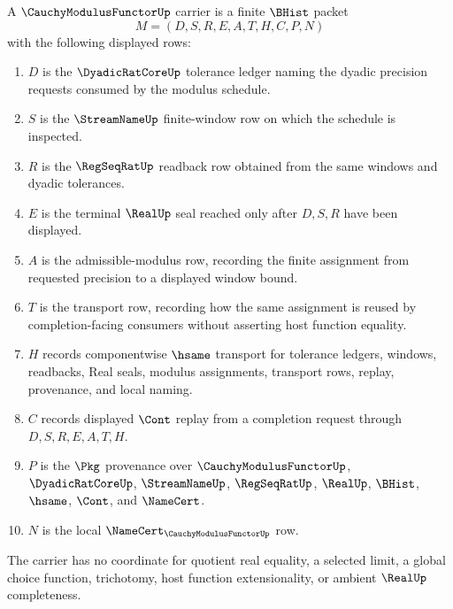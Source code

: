 \begin{definition}
\label{def:cauchy-modulus-functor-carrier}
A $\CauchyModulusFunctorUp$ carrier is a finite $\BHist$ packet
$$
M=(D,S,R,E,A,T,H,C,P,N)
$$
with the following displayed rows:
\begin{enumerate}
\item $D$ is the $\DyadicRatCoreUp$ tolerance ledger naming the dyadic precision requests consumed by the modulus schedule.
\item $S$ is the $\StreamNameUp$ finite-window row on which the schedule is inspected.
\item $R$ is the $\RegSeqRatUp$ readback row obtained from the same windows and dyadic tolerances.
\item $E$ is the terminal $\RealUp$ seal reached only after $D,S,R$ have been displayed.
\item $A$ is the admissible-modulus row, recording the finite assignment from requested precision to a displayed window bound.
\item $T$ is the transport row, recording how the same assignment is reused by completion-facing consumers without asserting host function equality.
\item $H$ records componentwise $\hsame$ transport for tolerance ledgers, windows, readbacks, Real seals, modulus assignments, transport rows, replay, provenance, and local naming.
\item $C$ records displayed $\Cont$ replay from a completion request through $D,S,R,E,A,T,H$.
\item $P$ is the $\Pkg$ provenance over $\CauchyModulusFunctorUp$, $\DyadicRatCoreUp$, $\StreamNameUp$, $\RegSeqRatUp$, $\RealUp$, $\BHist$, $\hsame$, $\Cont$, and $\NameCert$.
\item $N$ is the local $\NameCert_{\CauchyModulusFunctorUp}$ row.
\end{enumerate}
The carrier has no coordinate for quotient real equality, a selected limit, a global choice function, trichotomy, host function extensionality, or ambient $\RealUp$ completeness.
\end{definition}

